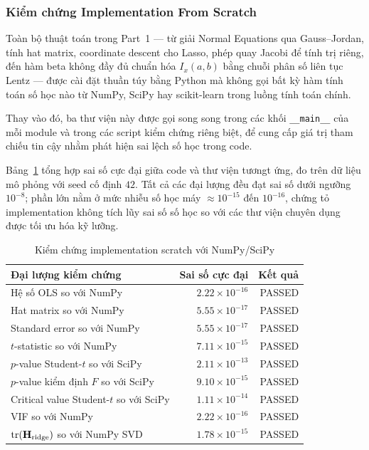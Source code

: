 \subsubsection{Kiểm chứng Implementation From Scratch}

Toàn bộ thuật toán trong Part~1 --- từ giải Normal Equations qua Gauss--Jordan, tính
hat matrix, coordinate descent cho Lasso, phép quay Jacobi để tính trị riêng, đến hàm
beta không đầy đủ chuẩn hóa $I_x(a,b)$ bằng chuỗi phân số liên tục Lentz --- được cài
đặt thuần túy bằng Python mà không gọi bất kỳ hàm tính toán số học nào từ NumPy,
SciPy hay scikit-learn trong luồng tính toán chính.

Thay vào đó, ba thư viện này được gọi song song trong các khối \texttt{\_\_main\_\_} của mỗi module và trong các script kiểm
chứng riêng biệt, để cung cấp giá trị tham chiếu tin cậy nhằm phát hiện sai lệch số học
trong code.

Bảng~\ref{tab:part1_verification} tổng hợp sai số cực đại giữa code và
thư viện tươngt ứng, đo trên dữ liệu mô phỏng với seed cố định $42$. Tất cả các đại lượng
đều đạt sai số dưới ngưỡng $10^{-8}$; phần lớn nằm ở mức nhiễu số học máy
$\approx 10^{-15}$ đến $10^{-16}$, chứng tỏ implementation không tích lũy sai số số học
so với các thư viện chuyên dụng được tối ưu hóa kỹ lưỡng.

\begin{table}[H]
\centering
\caption{Kiểm chứng implementation scratch với NumPy/SciPy}
\label{tab:part1_verification}
\begin{tabular}{lrr}
\toprule
\textbf{Đại lượng kiểm chứng} & \textbf{Sai số cực đại} & \textbf{Kết quả} \\ \midrule
Hệ số OLS so với NumPy & $2.22\times10^{-16}$ & PASSED \\
Hat matrix so với NumPy & $5.55\times10^{-17}$ & PASSED \\
Standard error so với NumPy & $5.55\times10^{-17}$ & PASSED \\
$t$-statistic so với NumPy & $7.11\times10^{-15}$ & PASSED \\
$p$-value Student-$t$ so với SciPy & $2.11\times10^{-13}$ & PASSED \\
$p$-value kiểm định $F$ so với SciPy & $9.10\times10^{-15}$ & PASSED \\
Critical value Student-$t$ so với SciPy & $1.11\times10^{-14}$ & PASSED \\
VIF so với NumPy & $2.22\times10^{-16}$ & PASSED \\
$\operatorname{tr}(\mathbf{H}_{\mathrm{ridge}})$ so với NumPy SVD
    & $1.78\times10^{-15}$ & PASSED \\ \bottomrule
\end{tabular}
\end{table}
